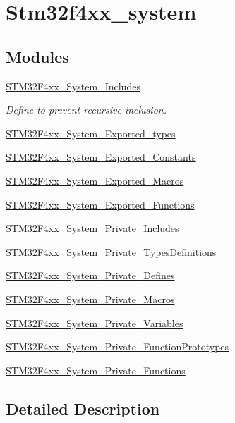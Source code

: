 \hypertarget{group__stm32f4xx__system}{}\section{Stm32f4xx\+\_\+system}
\label{group__stm32f4xx__system}
\subsection*{Modules}
\begin{DoxyCompactItemize}
\item 
\hyperlink{group___s_t_m32_f4xx___system___includes}{S\+T\+M32\+F4xx\+\_\+\+System\+\_\+\+Includes}
\begin{DoxyCompactList}\small\item\em Define to prevent recursive inclusion. \end{DoxyCompactList}\item 
\hyperlink{group___s_t_m32_f4xx___system___exported__types}{S\+T\+M32\+F4xx\+\_\+\+System\+\_\+\+Exported\+\_\+types}
\item 
\hyperlink{group___s_t_m32_f4xx___system___exported___constants}{S\+T\+M32\+F4xx\+\_\+\+System\+\_\+\+Exported\+\_\+\+Constants}
\item 
\hyperlink{group___s_t_m32_f4xx___system___exported___macros}{S\+T\+M32\+F4xx\+\_\+\+System\+\_\+\+Exported\+\_\+\+Macros}
\item 
\hyperlink{group___s_t_m32_f4xx___system___exported___functions}{S\+T\+M32\+F4xx\+\_\+\+System\+\_\+\+Exported\+\_\+\+Functions}
\item 
\hyperlink{group___s_t_m32_f4xx___system___private___includes}{S\+T\+M32\+F4xx\+\_\+\+System\+\_\+\+Private\+\_\+\+Includes}
\item 
\hyperlink{group___s_t_m32_f4xx___system___private___types_definitions}{S\+T\+M32\+F4xx\+\_\+\+System\+\_\+\+Private\+\_\+\+Types\+Definitions}
\item 
\hyperlink{group___s_t_m32_f4xx___system___private___defines}{S\+T\+M32\+F4xx\+\_\+\+System\+\_\+\+Private\+\_\+\+Defines}
\item 
\hyperlink{group___s_t_m32_f4xx___system___private___macros}{S\+T\+M32\+F4xx\+\_\+\+System\+\_\+\+Private\+\_\+\+Macros}
\item 
\hyperlink{group___s_t_m32_f4xx___system___private___variables}{S\+T\+M32\+F4xx\+\_\+\+System\+\_\+\+Private\+\_\+\+Variables}
\item 
\hyperlink{group___s_t_m32_f4xx___system___private___function_prototypes}{S\+T\+M32\+F4xx\+\_\+\+System\+\_\+\+Private\+\_\+\+Function\+Prototypes}
\item 
\hyperlink{group___s_t_m32_f4xx___system___private___functions}{S\+T\+M32\+F4xx\+\_\+\+System\+\_\+\+Private\+\_\+\+Functions}
\end{DoxyCompactItemize}


\subsection{Detailed Description}
